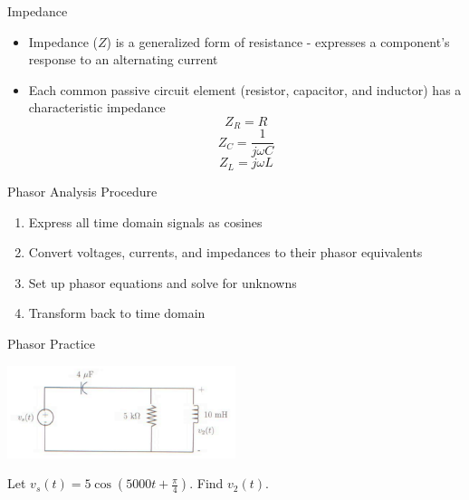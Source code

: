 \documentclass{beamer}
\begin{document}
    \begin{frame}{Impedance}
        \begin{itemize}
            \item Impedance ($Z$) is a generalized form of resistance - expresses a component's response to an alternating current
            \item Each common passive circuit element (resistor, capacitor, and inductor) has a characteristic impedance
            $$Z_R=R$$
            $$Z_C=\frac{1}{j\omega C}$$
            $$Z_L=j\omega L$$
        \end{itemize}
    \end{frame}
    
    \begin{frame}{Phasor Analysis Procedure}
        \begin{enumerate}
            \item Express all time domain signals as cosines
            \item Convert voltages, currents, and impedances to their phasor equivalents
            \item Set up phasor equations and solve for unknowns
            \item Transform back to time domain
        \end{enumerate}
    \end{frame}
    
    \begin{frame}{Phasor Practice}
        \begin{center}
            \includegraphics[width=0.5\textwidth]{phasor-practice.png}
        \end{center}
        Let $v_s(t)=5\cos(5000t+\frac{\pi}{4})$. Find $v_2(t)$.
    \end{frame}
\end{document}
